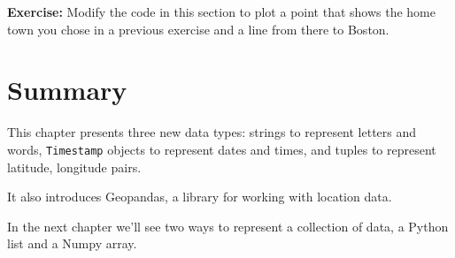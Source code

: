 \textbf{Exercise:} Modify the code in this section to plot a point that
shows the home town you chose in a previous exercise and a line from
there to Boston.

\hypertarget{summary}{%
\section{Summary}\label{summary}}

This chapter presents three new data types: strings to represent letters
and words, \passthrough{\lstinline!Timestamp!} objects to represent
dates and times, and tuples to represent latitude, longitude pairs.

It also introduces Geopandas, a library for working with location data.

In the next chapter we'll see two ways to represent a collection of
data, a Python list and a Numpy array.

